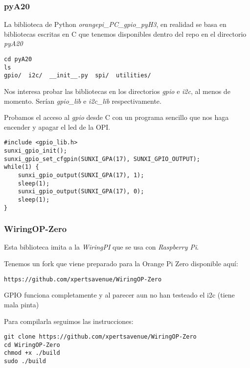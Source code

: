 \documentclass[12pt,spanish,]{scrartcl}
\begin{document}
\hypertarget{pya20}{%
\subsubsection{pyA20}\label{pya20}}

La biblioteca de Python \emph{orangepi\_PC\_gpio\_pyH3}, en realidad se
basa en bibliotecas escritas en C que tenemos disponibles dentro del
repo en el directorio \emph{pyA20}

\begin{verbatim}
cd pyA20
ls
gpio/  i2c/  __init__.py  spi/  utilities/
\end{verbatim}

Nos interesa probar las bibliotecas en los directorios \emph{gpio} e
\emph{i2c}, al menos de momento. Serían \emph{gpio\_lib} e
\emph{i2c\_lib} respectivamente.

Probamos el acceso al \emph{gpio} desde C con un programa sencillo que
nos haga encender y apagar el led de la OPI.

\begin{verbatim}
#include <gpio_lib.h>
sunxi_gpio_init();
sunxi_gpio_set_cfgpin(SUNXI_GPA(17), SUNXI_GPIO_OUTPUT);
while(1) {
    sunxi_gpio_output(SUNXI_GPA(17), 1);
    sleep(1);
    sunxi_gpio_output(SUNXI_GPA(17), 0);
    sleep(1);
}
\end{verbatim}

\hypertarget{wiringop-zero}{%
\subsubsection{WiringOP-Zero}\label{wiringop-zero}}

Esta biblioteca imita a la \emph{WiringPI} que se usa con
\emph{Raspberry Pi}.

Tenemos un fork que viene preparado para la Orange Pi Zero disponible
aquí:

\begin{verbatim}
https://github.com/xpertsavenue/WiringOP-Zero
\end{verbatim}

GPIO funciona completamente y al parecer aun no han testeado el i2c
(tiene mala pinta)

Para compilarla seguimos las instrucciones:

\begin{verbatim}
git clone https://github.com/xpertsavenue/WiringOP-Zero
cd WiringOP-Zero
chmod +x ./build
sudo ./build
\end{verbatim}
\end{document}
